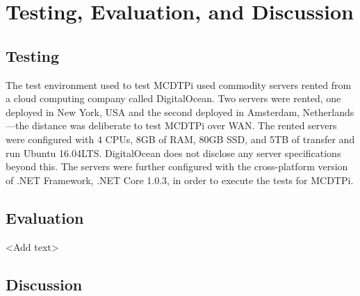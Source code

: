 \chapter{Testing, Evaluation, and Discussion}

\section{Testing}

The test environment used to test MCDTPi used commodity servers rented from a cloud computing company called DigitalOcean. Two servers were rented, one deployed in New York, USA and the second deployed in Amsterdam, Netherlands---the distance was deliberate to test MCDTPi over WAN. The rented servers were configured with 4 CPUs, 8GB of RAM, 80GB SSD, and 5TB of transfer and run Ubuntu 16.04LTS. DigitalOcean does not disclose any server specifications beyond this. The servers were further configured with the cross-platform version of .NET Framework, .NET Core 1.0.3, in order to execute the tests for MCDTPi.



\section{Evaluation}

<Add text>

\section{Discussion}